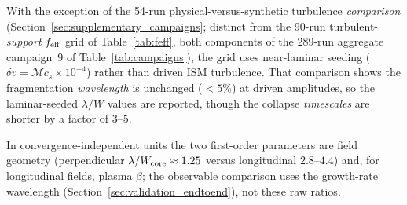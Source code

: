 \documentclass[usenatbib,twoside,twocolumn]{mnras}
\begin{document}
With the exception of the 54-run physical-versus-synthetic turbulence \emph{comparison} (Section~\ref{sec:supplementary_campaigns}; distinct from the 90-run turbulent-\emph{support} $f_{\rm eff}$ grid of Table~\ref{tab:feff}, both components of the 289-run aggregate campaign~9 of Table~\ref{tab:campaigns}), the grid uses near-laminar seeding ($\delta v=\mathcal{M}c_s\times10^{-4}$) rather than driven ISM turbulence. That comparison shows the fragmentation \textit{wavelength} is unchanged ($<5\%$) at driven amplitudes, so the laminar-seeded $\lambda/W$ values are reported, though the collapse \textit{timescales} are shorter by a factor of $3$--$5$.

In convergence-independent units the two first-order parameters are field geometry (perpendicular $\lambda/W_{\rm core}\approx1.25$ versus longitudinal $2.8$--$4.4$) and, for longitudinal fields, plasma $\beta$; the observable comparison uses the growth-rate wavelength (Section~\ref{sec:validation_endtoend}), not these raw ratios.



\end{document}
